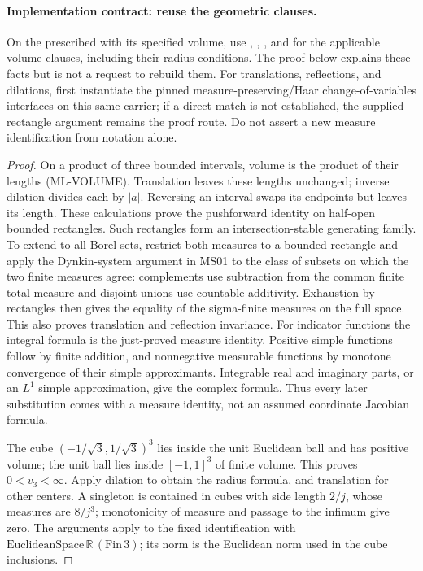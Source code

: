\documentclass[11pt,a4paper]{article}
\theoremstyle{remark}\newtheorem{remark}[theorem]{Remark}
\newcommand{\R}{\mathbb R}\newcommand{\C}{\mathbb C}\newcommand{\N}{\mathbb N}
\begin{document}
\paragraph{Implementation contract: reuse the geometric clauses.}
On the prescribed  with its specified volume, use , , , and  for the applicable volume clauses, including their radius conditions. The proof below explains these facts but is not a request to rebuild them. For translations, reflections, and dilations, first instantiate the pinned measure-preserving/Haar change-of-variables interfaces on this same carrier; if a direct match is not established, the supplied rectangle argument remains the proof route. Do not assert a new measure identification from notation alone.
\begin{proof}
On a product of three bounded intervals, volume is the product of their lengths (ML-VOLUME). Translation leaves these lengths unchanged; inverse dilation divides each by $|a|$. Reversing an interval swaps its endpoints but leaves its length. These calculations prove the pushforward identity on half-open bounded rectangles. Such rectangles form an intersection-stable generating family. To extend to all Borel sets, restrict both measures to a bounded rectangle and apply the Dynkin-system argument in MS01 to the class of subsets on which the two finite measures agree: complements use subtraction from the common finite total measure and disjoint unions use countable additivity. Exhaustion by rectangles then gives the equality of the sigma-finite measures on the full space. This also proves translation and reflection invariance. For indicator functions the integral formula is the just-proved measure identity. Positive simple functions follow by finite addition, and nonnegative measurable functions by monotone convergence of their simple approximants. Integrable real and imaginary parts, or an $L^1$ simple approximation, give the complex formula. Thus every later substitution comes with a measure identity, not an assumed coordinate Jacobian formula.

The cube $(-1/\sqrt3,1/\sqrt3)^3$ lies inside the unit Euclidean ball and has positive volume; the unit ball lies inside $[-1,1]^3$ of finite volume. This proves $0<v_3<\infty$. Apply dilation to obtain the radius formula, and translation for other centers. A singleton is contained in cubes with side length $2/j$, whose measures are $8/j^3$; monotonicity of measure and passage to the infimum give zero. The arguments apply to the fixed identification with $\mathrm{EuclideanSpace}\,\R\,(\mathrm{Fin}\,3)$; its norm is the Euclidean norm used in the cube inclusions.
\end{proof}
\end{document}
